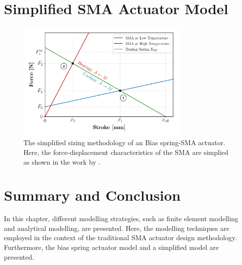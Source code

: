 \section{Simplified SMA Actuator Model}\label{sec:simplified-sma-model}
\begin{figure}[hbt]
    \centering
    \includegraphics[width=0.75\textwidth]{images/chap2/simplied-sma-bias-spring-wp.pdf}
    \caption{The simplified sizing methodology of an Bias spring-SMA actuator. Here, the force-displacement characteristics of the SMA are simplied as shown in the work by \todocite.}
    \label{fig:simplied-sma-bias-spring-wp}
\end{figure}
\section{Summary and Conclusion}
In this chapter, different modelling strategies, such as finite element modelling and analytical modelling, are presented. Here, the modelling techniques are employed in the context of the traditional SMA actuator design methodology. Furthermore, the bias spring actuator model and a simplified model are presented.

